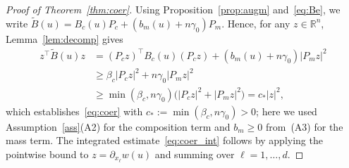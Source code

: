 \documentclass[10pt,a4paper]{amsart}
\newcommand{\Be}{\widetilde{B}}       %
\newcommand{\Pc}{P_c}                 %
\newcommand{\Pm}{P_m}                 %
\newcommand{\R}{\mathbb{R}}
\begin{document}
\begin{proof}[Proof of Theorem~\ref{thm:coer}]
Using Proposition~\ref{prop:augm} and~\eqref{eq:Be}, we write
$\Be(u) = B_c(u)\Pc + (b_m(u)+n\gamma_0)\Pm$.
Hence, for any $z\in\R^n$, Lemma~\ref{lem:decomp} gives
\begin{align*}
  z^\top\Be(u)z
  &= (\Pc z)^\top B_c(u)(\Pc z) + (b_m(u)+n\gamma_0)|\Pm z|^2 \\
  &\ge \beta_c|\Pc z|^2 + n\gamma_0|\Pm z|^2 \\
  &\ge \min(\beta_c,n\gamma_0)\bigl(|\Pc z|^2+|\Pm z|^2\bigr)
   = c_*|z|^2,
\end{align*}
which establishes~\eqref{eq:coer} with $c_* := \min(\beta_c,n\gamma_0)>0$; here we used
Assumption~\ref{ass}(A2) for the composition term and $b_m\ge 0$
from~(A3) for the mass term.
The integrated estimate~\eqref{eq:coer_int} follows by applying the
pointwise bound to $z = \partial_{x_\ell}w(u)$ and summing over
$\ell=1,\dots,d$.
\end{proof}
\end{document}
